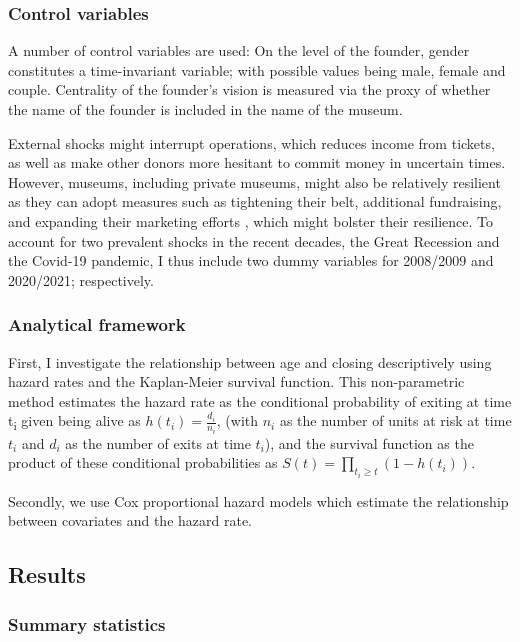 \documentclass[12pt]{article}
\begin{document}
\subsubsection*{Control variables}


\bigbreak
\noindent
A number of control variables are used: 
On the level of the founder, gender constitutes a time-invariant variable; with possible values being male, female and couple.
Centrality of the founder's vision is measured via the proxy of whether the name of the founder is included in the name of the museum.




External shocks might interrupt operations, which reduces income from tickets, as well as make other donors more hesitant to commit money in uncertain times.
However, museums, including private museums, might also be relatively resilient as they can adopt measures such as tightening their belt, additional fundraising, and expanding their marketing efforts \parencite{Geller_Salamon_2010_resilience}, which might bolster their resilience.
To account for two prevalent shocks in the recent decades, the Great Recession and the Covid-19 pandemic, I thus include two dummy variables for 2008/2009 and 2020/2021; respectively.
\subsubsection*{Analytical framework}



First, I investigate the relationship between age and closing descriptively using hazard rates and the Kaplan-Meier survival function.
This non-parametric method estimates the hazard rate as the conditional probability of exiting at time t\textsubscript{i} given being alive as \(h(t_i) = \frac{d_i}{n_i}\), (with \(n_i\) as the number of units at risk at time \(t_i\) and \(d_i\) as the number of exits at time \(t_i\)), and the survival function as the product of these conditional probabilities as \(S(t) = \prod_{t_i \geq t} \left(1-h(t_i) \right)\).





Secondly, we use Cox proportional hazard models which estimate the relationship between covariates and the hazard rate.
\subsection*{Results}


\subsubsection*{Summary statistics}
\end{document}
